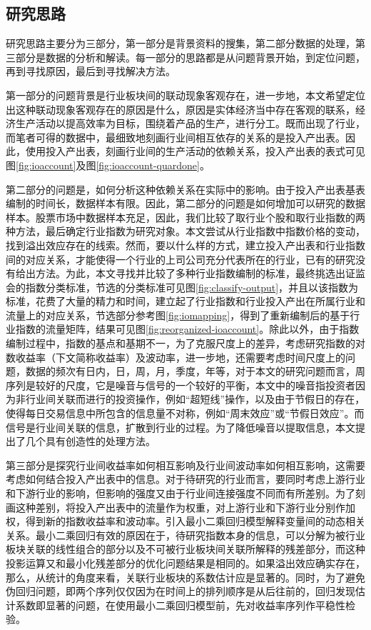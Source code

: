 \documentclass{sysuthesis}
\begin{document}
\subsection{研究思路}

研究思路主要分为三部分，第一部分是背景资料的搜集，第二部分数据的处理，第三部分是数据的分析和解读。每一部分的思路都是从问题背景开始，到定位问题，再到寻找原因，最后到寻找解决方法。

第一部分的问题背景是行业板块间的联动现象客观存在，进一步地，本文希望定位出这种联动现象客观存在的原因是什么，原因是实体经济当中存在客观的联系，经济生产活动以提高效率为目标，围绕着产品的生产，进行分工。既而出现了行业，而笔者可得的数据中，最细致地刻画行业间相互依存的关系的是投入产出表。因此，使用投入产出表，刻画行业间的生产活动的依赖关系，投入产出表的表式可见图\ref{fig:ioaccount}及图\ref{fig:ioaccount-quardone}。

第二部分的问题是，如何分析这种依赖关系在实际中的影响。由于投入产出表基表编制的时间长，数据样本有限。因此，第二部分的问题是如何增加可以研究的数据样本。股票市场中数据样本充足，因此，我们比较了取行业个股和取行业指数的两种方法，最后确定行业指数为研究对象。本文尝试从行业指数中指数价格的变动，找到溢出效应存在的线索。然而，要以什么样的方式，建立投入产出表和行业指数间的对应关系，才能使得一个行业的上司公司充分代表所在的行业，已有的研究没有给出方法。为此，本文寻找并比较了多种行业指数编制的标准，最终挑选出证监会的指数分类标准，节选的分类标准可见图\ref{fig:classify-output}，并且以该指数为标准，花费了大量的精力和时间，建立起了行业指数和行业投入产出在所属行业和流量上的对应关系，节选部分参考图\ref{fig:iomapping}，得到了重新编制后的基于行业指数的流量矩阵，结果可见图\ref{fig:reorganized-ioaccount}。除此以外，由于指数编制过程中，指数的基点和基期不一，为了克服尺度上的差异，考虑研究指数的对数收益率（下文简称收益率）及波动率，进一步地，还需要考虑时间尺度上的问题，数据的频次有日内，日，周，月，季度，年等，对于本文的研究问题而言，周序列是较好的尺度，它是噪音与信号的一个较好的平衡，本文中的噪音指投资者因为非行业间关联而进行的投资操作，例如“超短线”操作，以及由于节假日的存在，使得每日交易信息中所包含的信息量不对称，例如“周末效应”或“节假日效应”。而信号是行业间关联的信息，扩散到行业的过程。为了降低噪音以提取信息，本文提出了几个具有创造性的处理方法。

第三部分是探究行业间收益率如何相互影响及行业间波动率如何相互影响，这需要考虑如何结合投入产出表中的信息。对于待研究的行业而言，要同时考虑上游行业和下游行业的影响，但影响的强度又由于行业间连接强度不同而有所差别。为了刻画这种差别，将投入产出表中的流量作为权重，对上游行业和下游行业分别作加权，得到新的指数收益率和波动率。引入最小二乘回归模型解释变量间的动态相关关系。最小二乘回归有效的原因在于，待研究指数本身的信息，可以分解为被行业板块关联的线性组合的部分以及不可被行业板块间关联所解释的残差部分，而这种投影运算又和最小化残差部分的优化问题结果是相同的。如果溢出效应确实存在，那么，从统计的角度来看，关联行业板块的系数估计应是显著的。同时，为了避免伪回归问题，即两个序列仅仅因为在时间上的排列顺序是从后往前的，回归发现估计系数即显著的问题，在使用最小二乘回归模型前，先对收益率序列作平稳性检验。
\end{document}
